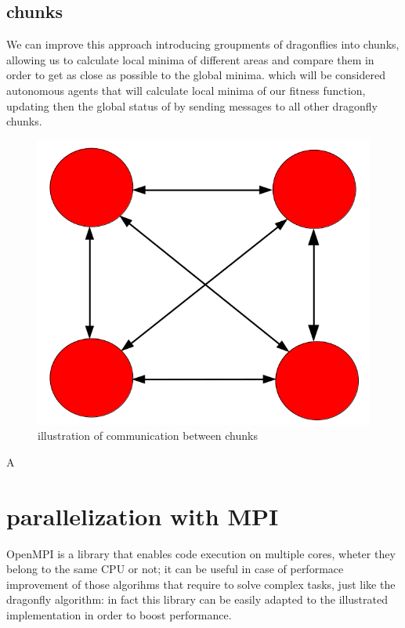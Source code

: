 \documentclass[10pt]{article}
\begin{document}
\begin{multicols}{2}
\begin{itemize}
  
\subsection*{chunks}



We can improve this approach introducing groupments of dragonflies into chunks, 
allowing us to calculate local minima of different areas and compare them in order
to get as close as possible to the global minima. which will be considered
autonomous agents that will calculate local minima of our fitness function, updating then the 
global status of by sending messages to all other dragonfly chunks. 

\begin{figure}[H]
  \includegraphics[scale=0.3]{chunks.png}
  \caption{illustration of communication between chunks}
\end{figure}


A


\section{parallelization with MPI}

OpenMPI is a library that enables code execution on multiple cores, wheter they belong
to the same CPU or not; it can be useful in case of performace improvement of those algorihms
that require to solve complex tasks, just like the dragonfly algorithm: in fact this library can be easily 
adapted to the illustrated implementation in order to boost performance.


\end{itemize}
\end{multicols}
\end{document}
